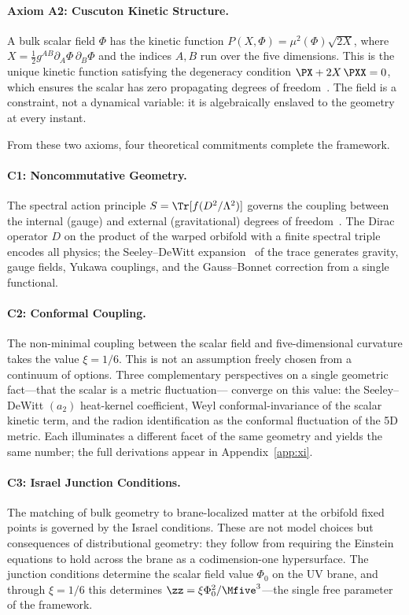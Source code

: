 \paragraph{Axiom A2: Cuscuton Kinetic Structure.}
A bulk scalar field $\Phi$ has the kinetic function
$P(X, \Phi) = \mu^2(\Phi)\sqrt{2X}$, where
$X = \tfrac{1}{2} g^{AB} \partial_A \Phi\, \partial_B \Phi$ and the
indices $A, B$ run over the five dimensions. This is the unique
kinetic function satisfying the degeneracy condition
$\PX + 2X\,\PXX = 0$, which ensures the scalar has zero propagating
degrees of freedom~\cite{ch1:afshordi07,ch1:iyonaga18}. The field is a
constraint, not a dynamical variable: it is algebraically enslaved to
the geometry at every instant.

From these two axioms, four theoretical commitments complete the
framework.

\paragraph{C1: Noncommutative Geometry.}
The spectral action principle $S = \Tr[f(D^2/\Lambda^2)]$ governs the
coupling between the internal (gauge) and external (gravitational)
degrees of freedom~\cite{ch1:chamseddine97,ch1:connes94}. The Dirac
operator $D$ on the product of the warped orbifold with a finite
spectral triple encodes all physics; the Seeley--DeWitt
expansion~\cite{ch1:gilkey75} of the trace generates gravity, gauge
fields, Yukawa couplings, and the Gauss--Bonnet correction from a
single functional.

\paragraph{C2: Conformal Coupling.}
The non-minimal coupling between the scalar field and five-dimensional
curvature takes the value $\xi = 1/6$. This is not an assumption freely
chosen from a continuum of options. Three complementary perspectives
on a single geometric fact---that the scalar is a metric fluctuation---
converge on this value: the Seeley--DeWitt $(a_2)$ heat-kernel
coefficient, Weyl conformal-invariance of the scalar kinetic term, and
the radion identification as the conformal fluctuation of the 5D metric.
Each illuminates a different facet of the same geometry and yields the
same number; the full derivations appear in
Appendix~\ref{app:xi}.

\paragraph{C3: Israel Junction Conditions.}
The matching of bulk geometry to brane-localized matter at the orbifold
fixed points is governed by the Israel conditions. These are not model
choices but consequences of distributional geometry: they follow from
requiring the Einstein equations to hold across the brane as a
codimension-one hypersurface. The junction conditions determine the
scalar field value $\Phi_0$ on the UV brane, and through $\xi = 1/6$
this determines $\zz = \xi \Phi_0^2 / \Mfive^3$---the single free
parameter of the framework.

